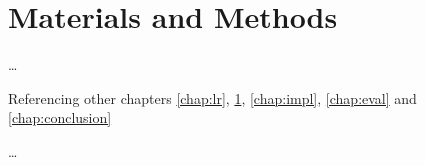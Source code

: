 \chapter{Materials and Methods}
\label{chap:met}


\ldots

Referencing other chapters \ref{chap:lr}, \ref{chap:met}, \ref{chap:impl}, \ref{chap:eval} and \ref{chap:conclusion}

\ldots